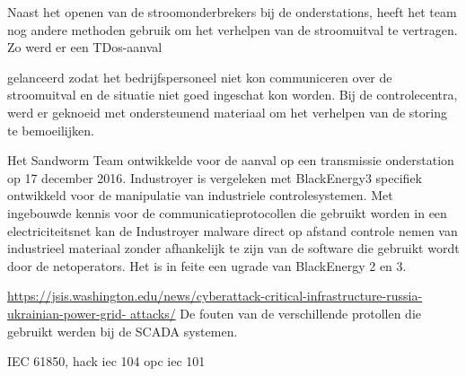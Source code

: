		Naast het openen van de stroomonderbrekers bij de onderstations, heeft het team nog andere
		methoden gebruik om het verhelpen van de stroomuitval te vertragen. Zo werd er een TDos-aanval
		
		gelanceerd zodat het bedrijfspersoneel niet kon communiceren over de stroomuitval en de situatie
		niet goed ingeschat kon worden. Bij de controlecentra, werd er geknoeid met ondersteunend
		materiaal om het verhelpen van de storing te bemoeilijken.
		
		Het Sandworm Team ontwikkelde voor de aanval op een transmissie onderstation op 17 december
		2016. Industroyer is vergeleken met BlackEnergy3 specifiek ontwikkeld voor de manipulatie van
		industriele controlesystemen. Met ingebouwde kennis voor de communicatieprotocollen die
		gebruikt worden in een electriciteitsnet kan de Industroyer malware direct op afstand controle
		nemen van industrieel materiaal zonder afhankelijk te zijn van de software die gebruikt wordt door
		de netoperators. Het is in feite een ugrade van BlackEnergy 2 en 3.
		
		
		\url{https://jsis.washington.edu/news/cyberattack-critical-infrastructure-russia-ukrainian-power-grid-
			attacks/}
		De fouten van de verschillende protollen die gebruikt werden bij de SCADA
		systemen.
		
		
		IEC 61850, hack
		iec 104
		opc
		iec 101
		
		
		

